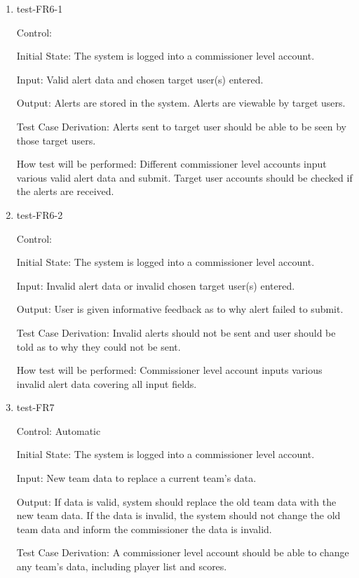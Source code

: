 \documentclass[12pt, titlepage]{article}
\begin{document}
\begin{enumerate}
\item{test-FR6-1\\}

Control: 

Initial State: The system is logged into a commissioner level account.
          
Input: Valid alert data and chosen target user(s) entered.
          
Output: Alerts are stored in the system. Alerts are viewable by target users.

Test Case Derivation: Alerts sent to target user should be able to be 
seen by those target users.

How test will be performed: Different commissioner level accounts input
various valid alert data and submit. Target user accounts should be checked
if the alerts are received.

\item{test-FR6-2\\}

Control: 

Initial State: The system is logged into a commissioner level account.
          
Input: Invalid alert data or invalid chosen target user(s) entered.
          
Output: User is given informative feedback as to why alert failed to submit.

Test Case Derivation: Invalid alerts should not be sent and user should
be told as to why they could not be sent.

How test will be performed: Commissioner level account inputs various invalid
alert data covering all input fields.

\item{test-FR7\\}

Control: Automatic

Initial State: The system is logged into a commissioner level account.
          
Input: New team data to replace a current team's data.
          
Output: If data is valid, system should replace the old team data with the new
team data. If the data is invalid, the system should not change the old team
data and inform the commissioner the data is invalid.

Test Case Derivation: A commissioner level account should be able to change
any team's data, including player list and scores.


\end{enumerate}
\end{document}
